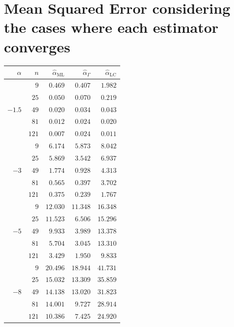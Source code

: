 \documentclass[10pt,a4paper]{article}
\begin{document}
\section{Mean Squared Error considering the cases where each estimator converges}

\vspace{1cm}

\begin{minipage}{0.5\linewidth}
\begin{tabular}{rrrrr}
	\toprule
	$\alpha$ & $n$ & $\widehat{\alpha}_{\text{ML}}$ & $\widehat{\alpha}_{\Gamma}$ & $\widehat{\alpha}_{\text{LC}}$\\
	\midrule
	\multirow{5 }{*}{$-1.5$}
	& $9$   & $0.469$ & $0.407$ & $1.982$ \\ 
	& $25$  & $0.050$ & $0.070$ & $0.219$ \\ 
	& $49$  & $0.020$ & $0.034$ & $0.043$ \\ 
	& $81$  & $0.012$ & $0.024$ & $0.020$ \\ 
	& $121$ & $0.007$ & $0.024$ & $0.011$ \\
	\midrule
	\multirow{5 }{*}{$-3$}
	& $9$   & $6.174$ & $5.873$ & $8.042$ \\ 
	& $25$  & $5.869$ & $3.542$ & $6.937$ \\ 
	& $49$  & $1.774$ & $0.928$ & $4.313$ \\ 
	& $81$  & $0.565$ & $0.397$ & $3.702$ \\ 
	& $121$ & $0.375$ & $0.239$ & $1.767$ \\
	\midrule
	\multirow{5 }{*}{$-5$} 
	& $9$   & $12.030$ & $11.348$ & $16.348$ \\ 
	& $25$  & $11.523$ & $6.506$  & $15.296$ \\ 
	& $49$  & $9.933$  & $3.989$  & $13.378$ \\ 
	& $81$  & $5.704$  & $3.045$  & $13.310$ \\ 
	& $121$ & $3.429$  & $1.950$  & $9.833$  \\
	\midrule
	\multirow{5 }{*}{$-8$} 
	& $9$   & $20.496$ & $18.944$ & $41.731$ \\ 
	& $25$  & $15.032$ & $13.309$ & $35.859$ \\ 
	& $49$  & $14.138$ & $13.020$ & $31.823$ \\ 
	& $81$  & $14.001$ & $9.727$  & $28.914$ \\ 
	& $121$ & $10.386$ & $7.425$  & $24.920$ \\ 
	\bottomrule
\end{tabular}
\end{minipage}
\end{document}
